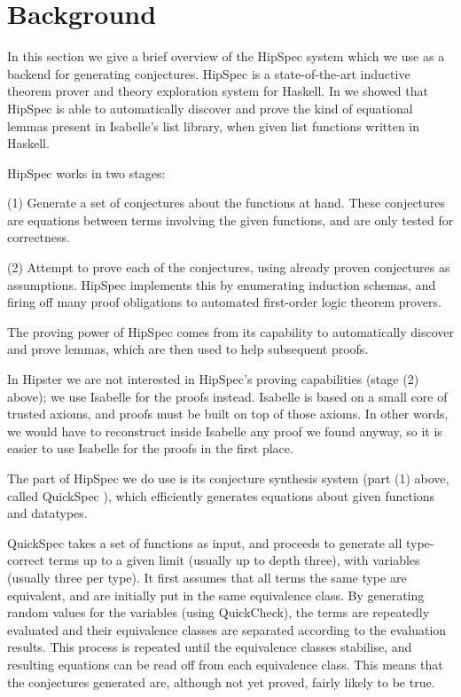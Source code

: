 \section{Background}
\label{sec:background}

In this section we give a brief overview of the HipSpec system which
we use as a backend for generating conjectures. HipSpec is a
state-of-the-art inductive theorem prover and theory exploration
system for Haskell. In \cite{hipspecCADE} we showed that HipSpec is
able to automatically discover and prove the kind of equational lemmas present in
Isabelle's list library, when given list functions written in Haskell.

HipSpec works in two stages:

(1) Generate a set of conjectures about the functions at hand. These conjectures are equations between terms involving the given functions, and are only tested for correctness.

(2) Attempt to prove each of the conjectures, using already proven conjectures as assumptions. HipSpec implements this by enumerating induction schemas, and firing off many proof obligations to automated first-order logic theorem provers.

The proving power of HipSpec comes from its capability to
automatically discover and prove lemmas, which are then used to help
subsequent proofs.

In Hipster we are not interested in HipSpec's
proving capabilities (stage (2) above); we use Isabelle for the proofs instead. Isabelle
is based on a small core of trusted axioms, and proofs must be built
on top of those axioms. In other words, we would have to reconstruct
inside Isabelle any proof we found anyway, so it is easier to use
Isabelle for the proofs in the first place.

The part of HipSpec we do use
is its conjecture synthesis system (part (1) above, called QuickSpec \cite{quickspec}),
which efficiently generates equations about given functions and
datatypes.

QuickSpec takes a set of functions as input, and proceeds to generate all
type-correct terms up to a given limit (usually up to depth three), with
variables (usually three per type).  It first assumes that all terms the same
type are equivalent, and are initially put in the same equivalence class.  By
generating random values for the variables (using QuickCheck\cite{quickcheck}), the terms are repeatedly evaluated and their equivalence
classes are separated according to the evaluation results.  This process is
repeated until the equivalence classes stabilise, and resulting equations can
be read off from each equivalence class.  This means that the conjectures
generated are, although not yet proved, fairly likely to be true.

